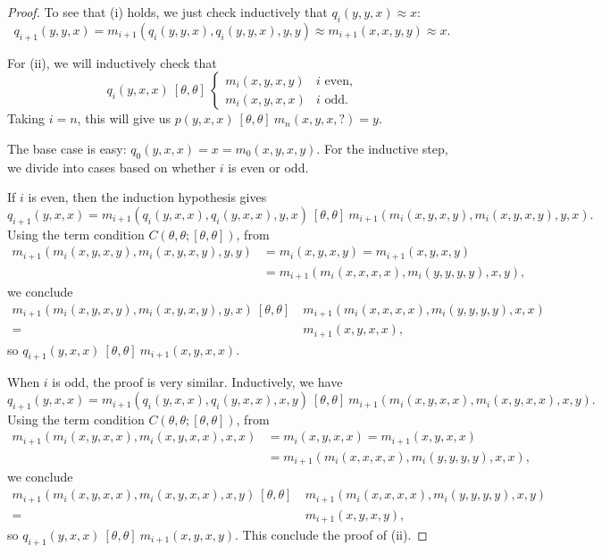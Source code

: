 \begin{appendices}
\begin{proof}
To see that (i) holds, we just check inductively that $q_i(y,y,x) \approx x$:
\[
q_{i+1}(y,y,x) = m_{i+1}(q_i(y,y,x),q_i(y,y,x),y,y) \approx m_{i+1}(x,x,y,y) \approx x.
\]

For (ii), we will inductively check that
\[
q_i(y,x,x)\ [\theta,\theta]\ \begin{cases} m_i(x,y,x,y) & i\text{ even,}\\ m_i(x,y,x,x) & i\text{ odd.}\end{cases}
\]
Taking $i = n$, this will give us $p(y,x,x)\ [\theta,\theta]\ m_n(x,y,x,?) = y$.

The base case is easy: $q_0(y,x,x) = x = m_0(x,y,x,y)$. For the inductive step, we divide into cases based on whether $i$ is even or odd.

If $i$ is even, then the induction hypothesis gives
\[
q_{i+1}(y,x,x) = m_{i+1}(q_i(y,x,x),q_i(y,x,x),y,x)\ [\theta,\theta]\ m_{i+1}(m_i(x,y,x,y),m_i(x,y,x,y),y,x).
\]
Using the term condition $C(\theta,\theta;[\theta,\theta])$, from
\begin{align*}
m_{i+1}(m_i(x,y,x,y),m_i(x,y,x,y),y,\boxed{y}) &= m_i(x,y,x,y) = m_{i+1}(x,y,x,y)\\
&= m_{i+1}(m_i(x,x,x,x),m_i(y,y,y,y),x,\boxed{y}),
\end{align*}
we conclude
\begin{align*}
m_{i+1}(m_i(x,y,x,y),m_i(x,y,x,y),y,\boxed{x})\ [\theta,\theta]\ &m_{i+1}(m_i(x,x,x,x),m_i(y,y,y,y),x,\boxed{x})\\
=\ &m_{i+1}(x,y,x,x),
\end{align*}
so $q_{i+1}(y,x,x)\ [\theta,\theta]\ m_{i+1}(x,y,x,x)$.

When $i$ is odd, the proof is very similar. Inductively, we have
\[
q_{i+1}(y,x,x) = m_{i+1}(q_i(y,x,x),q_i(y,x,x),x,y)\ [\theta,\theta]\ m_{i+1}(m_i(x,y,x,x),m_i(x,y,x,x),x,y).
\]
Using the term condition $C(\theta,\theta;[\theta,\theta])$, from
\begin{align*}
m_{i+1}(m_i(x,y,x,x),m_i(x,y,x,x),x,\boxed{x}) &= m_i(x,y,x,x) = m_{i+1}(x,y,x,x)\\
&= m_{i+1}(m_i(x,x,x,x),m_i(y,y,y,y),x,\boxed{x}),
\end{align*}
we conclude
\begin{align*}
m_{i+1}(m_i(x,y,x,x),m_i(x,y,x,x),x,\boxed{y})\ [\theta,\theta]\ &m_{i+1}(m_i(x,x,x,x),m_i(y,y,y,y),x,\boxed{y})\\
=\ &m_{i+1}(x,y,x,y),
\end{align*}
so $q_{i+1}(y,x,x)\ [\theta,\theta]\ m_{i+1}(x,y,x,y)$. This conclude the proof of (ii).


\end{proof}
\end{appendices}
